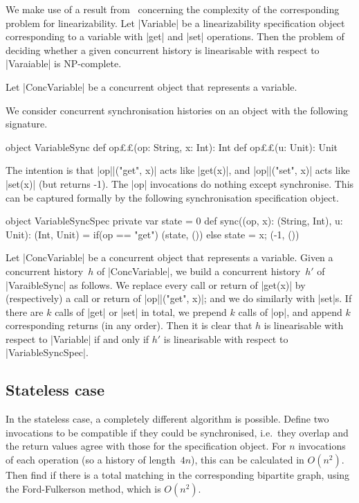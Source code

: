 We make use of a result from~\cite{???} concerning the complexity of the
corresponding problem for linearizability.  Let |Variable| be a
linearizability specification object corresponding to a variable with |get|
and |set| operations.  Then the problem of deciding whether a given concurrent
history is linearisable with respect to |Varaiable| is NP-complete.

Let |ConcVariable| be a concurrent object that represents a variable.  

We consider concurrent synchronisation histories on an object with the
following signature.   
\begin{scala}
object VariableSync{
  def op££(op: String, x: Int): Int
  def op££(u: Unit): Unit
} 
\end{scala}
%
The intention is that |op||("get", x)| acts like |get(x)|, and
|op||("set", x)| acts like |set(x)| (but returns -1).  The |op|
invocations do nothing except synchronise.  This can be captured formally by
the following synchronisation specification object.

\begin{scala}
object VariableSyncSpec{
  private var state = 0
  def sync((op, x): (String, Int), u: Unit): (Int, Unit) = 
    if(op == "get") (state, ()) else{ state = x; (-1, ()) }
}
\end{scala}


Let |ConcVariable| be a concurrent object that represents a variable.  Given a
concurrent history~$h$ of |ConcVariable|, we build a concurrent history~$h'$
of |VaraibleSync| as follows.  We replace every call or return of |get(x)| by
(respectively) a call or return of |op||("get", x)|; and we do similarly
with |set|s.  If there are $k$ calls of |get| or |set| in total, we prepend
$k$ calls of |op|, and append $k$ corresponding returns (in any order).
Then it is clear that $h$ is linearisable with respect to |Variable| if and
only if $h'$ is linearisable with respect to |VariableSyncSpec|.


\subsection{Stateless case}

In the stateless case, a completely different algorithm is possible.  Define
two invocations to be compatible if they could be synchronised, i.e.~they
overlap and the return values agree with those for the specification object.
For $n$ invocations of each operation (so a history of length~$4n$), this can
be calculated in $O(n^2)$.  Then find if there is a total matching in the
corresponding bipartite graph, using the Ford-Fulkerson method, which is
$O(n^2)$.
